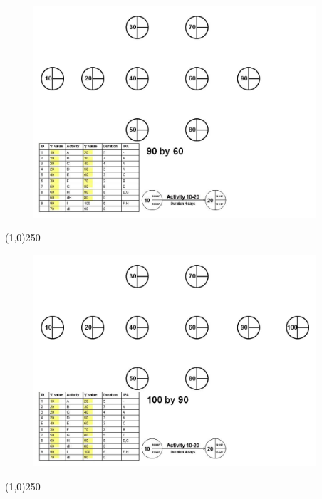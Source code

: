 \begin{frame}
\begin{figure}
	\centering
		\includegraphics[width = 10.5cm]{oldnotes/Slide89.jpg}
\end{figure}
\end{frame}
\begin{center}\line(1,0){250}\end{center}


\begin{frame}
\begin{figure}
	\centering
		\includegraphics[width = 10.5cm]{oldnotes/Slide90.jpg}
\end{figure}
\end{frame}
\begin{center}\line(1,0){250}\end{center}


